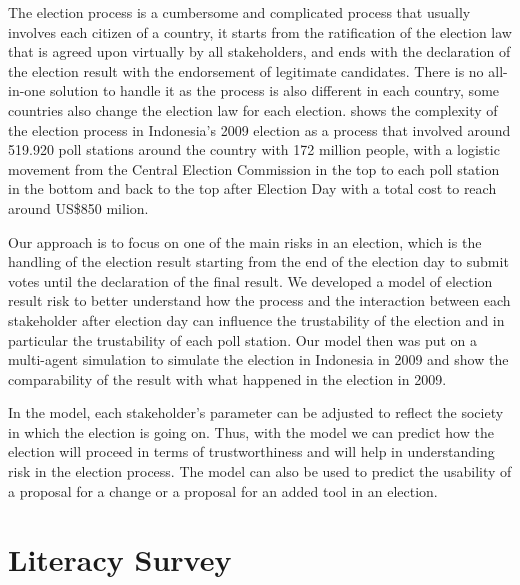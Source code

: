 \documentclass[JIP]{ipsj}
\begin{document}
The election process is a cumbersome and complicated process that usually involves each citizen of a country, it starts from the ratification of the election law that is agreed upon virtually by all stakeholders, and ends with the declaration of the election result with the endorsement of legitimate candidates. There is no all-in-one solution to handle it as the process is also different in each country, some countries also change the election law for each election. %
shows the complexity of the election process in Indonesia's 2009 election as a process that involved around 519.920 poll stations around the country with 172 million people, with a logistic movement from the Central Election Commission in the top to each poll station in the bottom and back to the top after Election Day with a total cost to reach around US\$850 milion.

Our approach is to focus on one of the main risks in an election, which is the handling of the election result starting from the end of the election day to submit votes until the declaration of the final result. We developed a model of election result risk to better understand how the process and the interaction between each stakeholder after election day can influence the trustability of the election and in particular the trustability of each poll station. Our model then was put on a multi-agent simulation to simulate the election in Indonesia in 2009 and show the comparability of the result with what happened in the election in 2009.

In the model, each stakeholder's parameter can be adjusted to reflect the society in which the election is going on. Thus, with the model we can predict how the election will proceed in terms of trustworthiness and will help in understanding risk in the election process. The model can also be used to predict the usability of a proposal for a change or a proposal for an added tool in an election.




\section{Literacy Survey}
\end{document}
